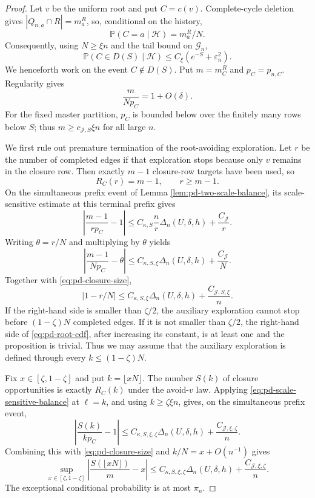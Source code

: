 \documentclass[11pt]{article}
\theoremstyle{remark}
\newcommand{\Pp}{\mathbb P}
\begin{document}
\begin{proof}
Let $v$ be the uniform root and put $C=c(v)$.  Complete-cycle deletion gives
$|Q_{n,a}\cap R|=m_a^R$, so, conditional on the history,
\[
        \Pp(C=a\mid\mathcal H)=m_a^R/N.
\]
Consequently, using $N\ge\xi n$ and the tail bound on $\mathcal G_n$,
\begin{equation}
 \Pp(C\in D(S)\mid\mathcal H)
 \le C_\xi(e^{-S}+\varepsilon_n^2).
 \label{eq:pd-closure-tail}
\end{equation}
We henceforth work on the event $C\notin D(S)$.  Put
$m=m_C^R$ and $p_C=p_{n,C}$.  Regularity gives
\begin{equation}
        \frac{m}{Np_C}=1+O(\delta).
 \label{eq:pd-closure-size}
\end{equation}
For the fixed master partition, $p_C$ is bounded below over the finitely many
rows below $S$; thus $m\ge c_{\mathcal J,S}\xi n$ for all large $n$.

We first rule out premature termination of the root-avoiding exploration.  Let
$r$ be the number of completed edges if that exploration stops because only
$v$ remains in the closure row.  Then exactly $m-1$ closure-row targets have
been used, so
\[
        R_C(r)=m-1,
        \qquad r\ge m-1.
\]
On the simultaneous prefix event of Lemma
\ref{lem:pd-two-scale-balance}, its scale-sensitive estimate at this terminal
prefix gives
\[
 \left|\frac{m-1}{r p_C}-1\right|
 \le C_{\kappa,S}\frac nr\Delta_n(U,\delta,h)
      +\frac{C_{\mathcal J}}r.
\]
Writing $\theta=r/N$ and multiplying by $\theta$ yields
\[
 \left|\frac{m-1}{Np_C}-\theta\right|
 \le C_{\kappa,S,\xi}\Delta_n(U,\delta,h)
      +\frac{C_{\mathcal J}}N.
\]
Together with \eqref{eq:pd-closure-size},
\begin{equation}
        |1-r/N|
        \le C_{\kappa,S,\xi}
        \Delta_n(U,\delta,h)+\frac{C_{\mathcal J,S,\xi}}n.
 \label{eq:pd-no-premature}
\end{equation}
If the right-hand side is smaller than $\zeta/2$, the auxiliary exploration
cannot stop before $(1-\zeta)N$ completed edges.  If it is not smaller than
$\zeta/2$, the right-hand side of \eqref{eq:pd-root-cdf}, after increasing its
constant, is at least one and the proposition is trivial.  Thus we may assume
that the auxiliary exploration is defined through every
$k\le(1-\zeta)N$.

Fix $x\in[\zeta,1-\zeta]$ and put $k=\lfloor xN\rfloor$.  The number $S(k)$
of closure opportunities is exactly $R_C(k)$ under the avoid-$v$ law.  Applying
\eqref{eq:pd-scale-sensitive-balance} at $\ell=k$, and using
$k\ge\zeta\xi n$, gives, on the simultaneous prefix event,
\[
 \left|\frac{S(k)}{k p_C}-1\right|
 \le C_{\kappa,S,\xi,\zeta}
       \Delta_n(U,\delta,h)+\frac{C_{\mathcal J,\xi,\zeta}}n.
\]
Combining this with \eqref{eq:pd-closure-size} and
$k/N=x+O(n^{-1})$ gives
\begin{equation}
 \sup_{x\in[\zeta,1-\zeta]}
 \left|\frac{S(\lfloor xN\rfloor)}m-x\right|
 \le C_{\kappa,S,\xi,\zeta}
       \Delta_n(U,\delta,h)+\frac{C_{\mathcal J,\xi,\zeta}}n.
 \label{eq:pd-closure-opportunities}
\end{equation}
The exceptional conditional probability is at most $\pi_n$.


\end{proof}
\end{document}

